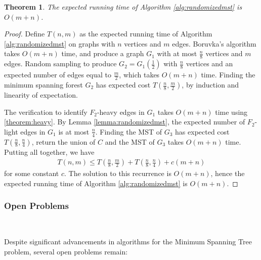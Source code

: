 \documentclass[11pt]{article}
\theoremstyle{plain}
\newtheorem{theorem}{Theorem}[section]
\begin{document}
\begin{theorem}
    The expected running time of Algorithm \ref{alg:randomizedmst} is $O(m+n)$.
\end{theorem}
\begin{proof}
    Define $T(n,m)$ as the expected running time of Algorithm \ref{alg:randomizedmst} on graphs with $n$ vertices and $m$ edges. Boruvka's algorithm takes $O(m+n)$ time, and produce a graph $G_1$ with at most $\frac{n}{8}$ vertices and $m$ edges. Random sampling to produce $G_2=G_1(\frac{1}{2})$ with $\frac{n}{8}$ vertices and an expected number of edges equal to $\frac{m}{2}$, which takes $O(m+n)$ time. Finding the minimum spanning forest $G_2$ has expected cost $T(\frac{n}{8},\frac{m}{2})$, by induction and linearity of expectation.

    The verification to identify $F_2$-heavy edges in $G_1$ takes $O(m+n)$ time using \ref{theorem:heavy}. By Lemma \ref{lemma:randomizedmst}, the expected number of $F_2$-light edges in $G_1$ is at most $\frac{n}{4}$. Finding the MST of $G_3$ has expected cost $T(\frac{n}{8},\frac{n}{4})$, return the union of $C$ and the MST of $G_3$ takes $O(m+n)$ time. Putting all together, we have
    \begin{align*}
        T\left(n,m\right)\leq T\left(\frac{n}{8},\frac{m}{2}\right)+T\left(\frac{n}{8},\frac{n}{4}\right)+c\left(m+n\right)
    \end{align*}
    for some constant $c$. The solution to this recurrence is $O(m+n)$, hence the expected running time of Algorithm \ref{alg:randomizedmst} is $O(m+n)$.
\end{proof}

\subsubsection{Open Problems}\

Despite significant advancements in algorithms for the Minimum Spanning Tree problem, several open problems remain:
\end{document}
